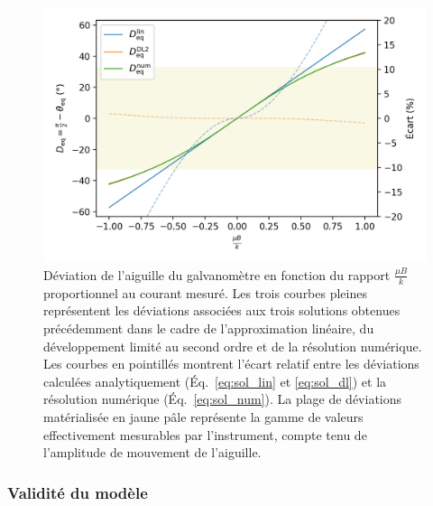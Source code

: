 \documentclass[12pt,a4paper,fleqn]{article}
\begin{document}
\begin{figure}[htbp]
    \center
    \includegraphics[scale=1]{deviation.png}
    \caption{Déviation de l'aiguille du galvanomètre en fonction du rapport $\tfrac{\mu B}{k}$ proportionnel au courant mesuré.
Les trois courbes pleines représentent les déviations associées aux trois solutions obtenues précédemment dans le cadre de l'approximation linéaire, du développement limité au second ordre et de la résolution numérique.
Les courbes en pointillés montrent l'écart relatif entre les déviations calculées analytiquement (Éq.~\ref{eq:sol_lin} et \ref{eq:sol_dl}) et la résolution numérique (Éq.~\ref{eq:sol_num}).
La plage de déviations matérialisée en jaune pâle représente la gamme de valeurs effectivement mesurables par l'instrument, compte tenu de l'amplitude de mouvement de l'aiguille.}
    \label{fig:deviation}
\end{figure}

\subsubsection{Validité du modèle}
\end{document}
